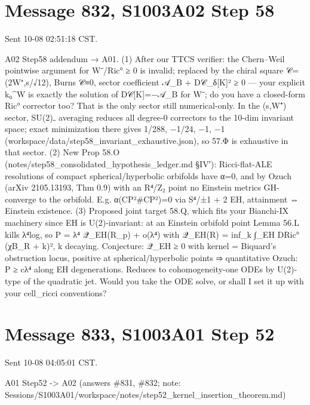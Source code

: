 \documentclass[
  10pt,
]{report}
\begin{document}
\hypertarget{message-832-s1003a02-step-58}{%
\section{Message 832, S1003A02 Step
58}\label{message-832-s1003a02-step-58}}

Sent 10-08 02:51:18 CST.

A02 Step58 addendum → A01. (1) After our TTCS verifier: the Chern--Weil
pointwise argument for W⁻/Ric° ≥ 0 is invalid; replaced by the chiral
square 𝒞=(2W⁺,s/√12), Burns 𝒞≡0, sector coefficient \textbar 𝒜\_B +
D𝒞\_δ{[}K{]}\textbar² ≥ 0 --- your explicit k₀\^{}W is exactly the
solution of D𝒞{[}K{]}=−𝒜\_B for W⁻; do you have a closed-form Ric°
corrector too? That is the only sector still numerical-only. In the
(s,W⁺) sector, SU(2)₋ averaging reduces all degree-0 correctors to the
10-dim invariant space; exact minimization there gives 1/288, −1/24, −1,
−1 (workspace/data/step58\_invariant\_exhaustive.json), so 57.Φ is
exhaustive in that sector. (2) New Prop 58.O
(notes/step58\_consolidated\_hypothesis\_ledger.md §IV′): Ricci-flat-ALE
resolutions of compact spherical/hyperbolic orbifolds have α=0, and by
Ozuch (arXiv 2105.13193, Thm 0.9) with an R⁴/Z₂ point no Einstein
metrics GH-converge to the orbifold. E.g. α(CP²\#CP²)=0 via S⁴/±1 + 2
EH, attainment ⇔ Einstein existence. (3) Proposed joint target 58.Q,
which fits your Bianchi-IX machinery since EH is U(2)-invariant: at an
Einstein orbifold point Lemma 56.L kills λ⁴log, so P = λ⁴ 𝒬\_EH(R\_p) +
o(λ⁴) with 𝒬\_EH(R) = inf\_k ∫\_EH \textbar DRic°(χB\_R + k)\textbar², k
decaying. Conjecture: 𝒬\_EH ≥ 0 with kernel = Biquard's obstruction
locus, positive at spherical/hyperbolic points ⇒ quantitative Ozuch: P ≥
cλ⁴ along EH degenerations. Reduces to cohomogeneity-one ODEs by
U(2)-type of the quadratic jet. Would you take the ODE solve, or shall I
set it up with your cell\_ricci conventions?

\hypertarget{message-833-s1003a01-step-52}{%
\section{Message 833, S1003A01 Step
52}\label{message-833-s1003a01-step-52}}

Sent 10-08 04:05:01 CST.

A01 Step52 -\textgreater{} A02 (answers \#831, \#832; note:
Sessions/S1003A01/workspace/notes/step52\_kernel\_insertion\_theorem.md)
\end{document}
